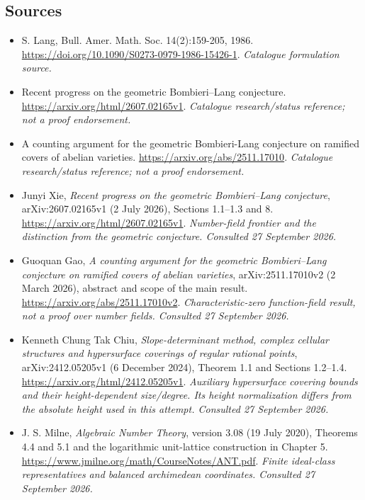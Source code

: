 \documentclass[11pt,a4paper]{article}
\numberwithin{equation}{section}
\begin{document}
\subsection{Sources}
\begin{itemize}\raggedright
\item[\textnormal{[S1]}]\hypertarget{source:9400081:1}{} S. Lang, Bull. Amer. Math. Soc. 14(2):159-205, 1986.
\url{https://doi.org/10.1090/S0273-0979-1986-15426-1}.
{\small\textit{Catalogue formulation source.}}
\item[\textnormal{[S2]}]\hypertarget{source:9400081:2}{} Recent progress on the geometric Bombieri–Lang conjecture.
\url{https://arxiv.org/html/2607.02165v1}.
{\small\textit{Catalogue research/status reference; not a proof endorsement.}}
\item[\textnormal{[S3]}]\hypertarget{source:9400081:3}{} A counting argument for the geometric Bombieri-Lang conjecture on ramified covers of abelian varieties.
\url{https://arxiv.org/abs/2511.17010}.
{\small\textit{Catalogue research/status reference; not a proof endorsement.}}

\item[\textnormal{[E1]}]\hypertarget{extra:9400081:1}{} Junyi Xie, \emph{Recent progress on the geometric Bombieri--Lang conjecture}, arXiv:2607.02165v1 (2 July 2026), Sections 1.1--1.3 and 8.
\url{https://arxiv.org/html/2607.02165v1}.
{\small\textit{Number-field frontier and the distinction from the geometric conjecture. Consulted 27 September 2026.}}
\item[\textnormal{[E2]}]\hypertarget{extra:9400081:2}{} Guoquan Gao, \emph{A counting argument for the geometric Bombieri--Lang conjecture on ramified covers of abelian varieties}, arXiv:2511.17010v2 (2 March 2026), abstract and scope of the main result.
\url{https://arxiv.org/abs/2511.17010v2}.
{\small\textit{Characteristic-zero function-field result, not a proof over number fields. Consulted 27 September 2026.}}
\item[\textnormal{[E3]}]\hypertarget{extra:9400081:3}{} Kenneth Chung Tak Chiu, \emph{Slope-determinant method, complex cellular structures and hypersurface coverings of regular rational points}, arXiv:2412.05205v1 (6 December 2024), Theorem 1.1 and Sections 1.2--1.4.
\url{https://arxiv.org/html/2412.05205v1}.
{\small\textit{Auxiliary hypersurface covering bounds and their height-dependent size/degree. Its height normalization differs from the absolute height used in this attempt. Consulted 27 September 2026.}}
\item[\textnormal{[E4]}]\hypertarget{extra:9400081:4}{} J. S. Milne, \emph{Algebraic Number Theory}, version 3.08 (19 July 2020), Theorems 4.4 and 5.1 and the logarithmic unit-lattice construction in Chapter 5.
\url{https://www.jmilne.org/math/CourseNotes/ANT.pdf}.
{\small\textit{Finite ideal-class representatives and balanced archimedean coordinates. Consulted 27 September 2026.}}
\end{itemize}
\end{document}
